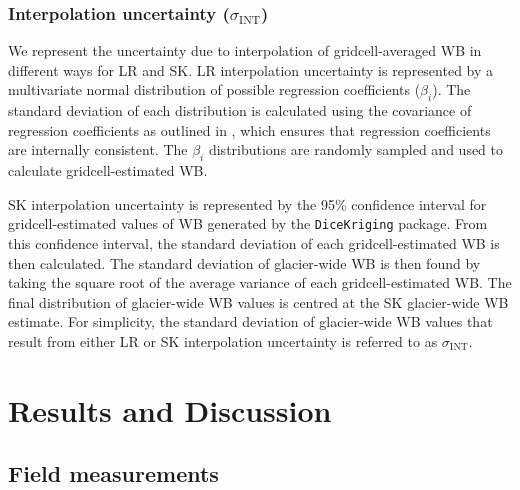 \documentclass[twocolumn, letterpaper]{igs}
\begin{document}
	\subsubsection{Interpolation uncertainty ($\sigma_{\mathrm{INT}}$)}
We represent the uncertainty due to interpolation of gridcell-averaged WB in different ways for LR and SK. LR interpolation uncertainty is represented by a multivariate normal distribution of possible regression coefficients ($\beta_i$). The standard deviation of each distribution is calculated using the covariance of regression coefficients as outlined in \cite{Bagos2015}, which ensures that regression coefficients are internally consistent. The $\beta_i$ distributions are randomly sampled and used to calculate gridcell-estimated WB.

SK interpolation uncertainty is represented by the 95\% confidence interval for gridcell-estimated values of WB generated by the \texttt{DiceKriging} package. From this confidence interval, the standard deviation of each gridcell-estimated WB is then calculated. The standard deviation of glacier-wide WB is then found by taking the square root of the average variance of each gridcell-estimated WB. The final distribution of glacier-wide WB values is centred at the SK glacier-wide WB estimate. For simplicity, the standard deviation of glacier-wide WB values that result from either LR or SK interpolation uncertainty is referred to as $\sigma_{\mathrm{INT}}$.



\section{Results and Discussion}

\subsection{Field measurements}
\end{document}
